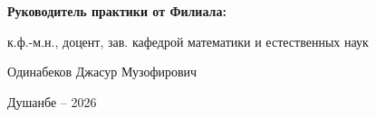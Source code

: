 \documentclass[a4paper,14pt]{extreport}
\begin{document}
\begin{titlepage}
\begin{minipage}{0.6\textwidth}
			\vspace{\baselineskip}
			
			\textbf{Руководитель практики от Филиала:}\par
			к.ф.-м.н., доцент, зав. кафедрой математики и естественных наук\par
		Одинабеков Джасур Музофирович
		\end{minipage}
		
		\vfill
		
		\begin{center}
			Душанбе – 2026
		\end{center}
	\end{titlepage}
	
	\clearpage
	\setcounter{page}{2}
	
	\tableofcontents
	\thispagestyle{plain}
	\newpage
	

\end{document}
